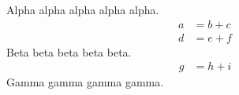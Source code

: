 \documentclass[11pt]{article}
\begin{document}
Alpha alpha alpha alpha alpha.
\begin{align}
  a &= b + c \\
  d &= e + f
\end{align}
Beta beta beta beta beta.
\begin{align*}
  g &= h + i
\end{align*}
Gamma gamma gamma gamma.
\end{document}
